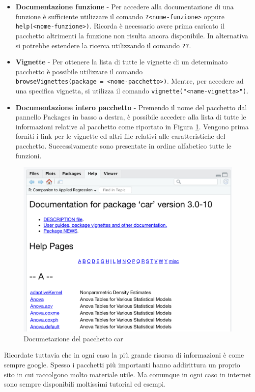 \documentclass[
]{book}
\begin{document}
\begin{itemize}
\item
  \textbf{Documentazione funzione} - Per accedere alla documentazione di una funzione è sufficiente utilizzare il comando \texttt{?\textless{}nome-funzione\textgreater{}} oppure \texttt{help(\textless{}nome-funzione\textgreater{})}. Ricorda è necessario avere prima caricato il pacchetto altrimenti la funzione non risulta ancora disponibile. In alternativa si potrebbe estendere la ricerca utilizzando il comando \texttt{??}.
\item
  \textbf{Vignette} - Per ottenere la lista di tutte le vignette di un determinato pacchetto è possibile utilizzare il comando \texttt{browseVignettes(package\ =\ \textless{}nome-pacchetto\textgreater{})\textquotesingle{}}. Mentre, per accedere ad una specifica vignetta, si utilizza il comando \texttt{vignette("\textless{}name-vignetta\textgreater{}")}.
\item
  \textbf{Documentazione intero pacchetto} - Premendo il nome del pacchetto dal pannello Packages in basso a destra, è possibile accedere alla lista di tutte le informazioni relative al pacchetto come riportato in Figura \ref{fig:package-documentation}. Vengono prima forniti i link per le vignette ed altri file relativi alle caratteristiche del pacchetto. Successivamente sono presentate in ordine alfabetico tutte le funzioni.
\end{itemize}

\begin{figure}

{\centering \includegraphics[width=0.65\linewidth]{images/package-documentation} 

}

\caption{Documetazione del pacchetto car}\label{fig:package-documentation}
\end{figure}

Ricordate tuttavia che in ogni caso la più grande risorsa di informazioni è come sempre google. Spesso i pacchetti più importanti hanno addirittura un proprio sito in cui raccolgono molto materiale utile. Ma comunque in ogni caso in internet sono sempre disponibili moltissimi tutorial ed esempi.
\end{document}
